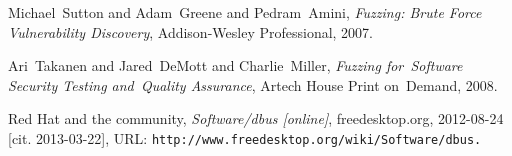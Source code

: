 \documentclass[conference]{IEEEtran}
\begin{document}

%
%
%
\begin{thebibliography}{1}

Michael~Sutton and Adam~Greene and Pedram~Amini, \emph{Fuzzing: Brute Force
Vulnerability Discovery}, Addison-Wesley Professional, 2007.

Ari~Takanen and Jared~DeMott and Charlie~Miller, \emph{Fuzzing for~Software
Security Testing and~Quality Assurance}, Artech House Print on~Demand, 2008.

Red Hat and the community, \emph{Software/dbus [online]}, freedesktop.org,
2012-08-24 [cit. 2013-03-22], URL: \tt http://www.freedesktop.org/wiki/Software/dbus.

\end{thebibliography}




\end{document}
